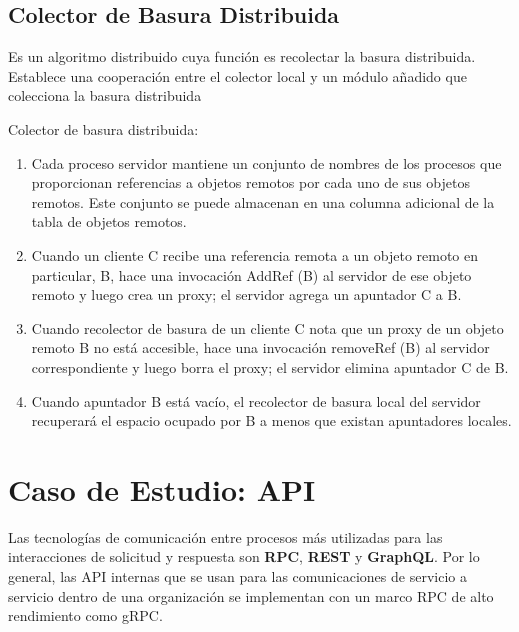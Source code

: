 \subsection{Colector de Basura Distribuida} 
Es un algoritmo distribuido cuya funci\'on es  recolectar la basura distribuida. Establece una cooperación entre el colector local y un módulo añadido que colecciona la basura distribuida

Colector de basura distribuida:
\begin{enumerate}
	\item  Cada proceso servidor mantiene un conjunto de nombres de los procesos que proporcionan referencias a objetos remotos por cada uno de sus objetos remotos. Este conjunto se puede almacenan en una columna adicional de la tabla de objetos remotos.
	\item Cuando un cliente C recibe una referencia remota a un objeto remoto en particular, B,  hace una invocación AddRef (B) al servidor de ese objeto remoto y luego crea un proxy; el servidor agrega un apuntador C a B.
	\item  Cuando  recolector de basura de un cliente C nota que un proxy de un objeto remoto B no está accesible, hace una invocación removeRef (B) al servidor correspondiente y luego borra el proxy; el servidor elimina apuntador C de B.
	\item Cuando apuntador B está vacío, el recolector de basura local del servidor recuperará el espacio ocupado por B a menos que existan apuntadores locales.
\end{enumerate}

\section{Caso de Estudio: API}

Las tecnologías de comunicación entre procesos más utilizadas para las interacciones de solicitud y respuesta son \textbf{RPC}, \textbf{REST} y \textbf{GraphQL}. Por lo general, las API internas que se usan para las comunicaciones de servicio a servicio dentro de una organización se implementan con un marco RPC de alto rendimiento como gRPC.


